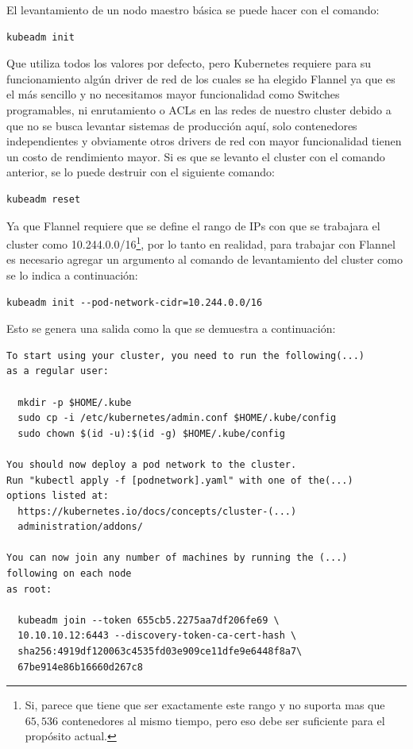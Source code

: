 El levantamiento de un nodo maestro básica se puede hacer con el comando:
    \begin{lstlisting}
kubeadm init
    \end{lstlisting}
Que utiliza todos los valores por defecto, pero Kubernetes requiere para su funcionamiento algún driver de red de los cuales se ha elegido Flannel ya que es el más sencillo y no necesitamos mayor funcionalidad como Switches programables, ni enrutamiento o ACLs en las redes de nuestro cluster debido a que no se busca levantar sistemas de producción aquí, solo contenedores independientes y obviamente otros drivers de red con mayor funcionalidad tienen un costo de rendimiento mayor. Si es que se levanto el cluster con el comando anterior, se lo puede destruir con el siguiente comando: 
    \begin{lstlisting}
kubeadm reset
    \end{lstlisting}
Ya que Flannel requiere que se define el rango de IPs con que se trabajara el cluster como 10.244.0.0/16\footnote{Si, parece que tiene que ser exactamente este rango y no suporta mas que $65,536$ contenedores al mismo tiempo, pero eso debe ser suficiente para el propósito actual.}, por lo tanto en realidad, para trabajar con Flannel es necesario agregar un argumento al comando de levantamiento del cluster como se lo indica a continuación:
    \begin{lstlisting}
kubeadm init --pod-network-cidr=10.244.0.0/16
    \end{lstlisting}
Esto se genera una salida como la que se demuestra a continuación:
    \begin{lstlisting}
To start using your cluster, you need to run the following(...)
as a regular user:

  mkdir -p $HOME/.kube
  sudo cp -i /etc/kubernetes/admin.conf $HOME/.kube/config
  sudo chown $(id -u):$(id -g) $HOME/.kube/config

You should now deploy a pod network to the cluster.
Run "kubectl apply -f [podnetwork].yaml" with one of the(...)
options listed at:
  https://kubernetes.io/docs/concepts/cluster-(...)
  administration/addons/

You can now join any number of machines by running the (...)
following on each node
as root:

  kubeadm join --token 655cb5.2275aa7df206fe69 \
  10.10.10.12:6443 --discovery-token-ca-cert-hash \
  sha256:4919df120063c4535fd03e909ce11dfe9e6448f8a7\
  67be914e86b16660d267c8
    \end{lstlisting}
\citep{kubernetes-create-cluster-kubeadm}

